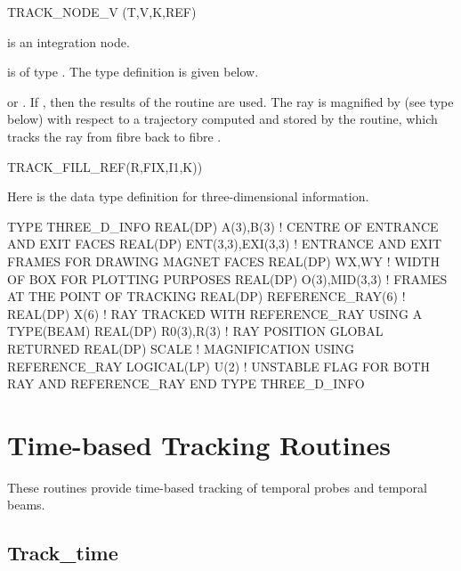 \begin{ptccode}
TRACK_NODE_V (T,V,K,REF)
\end{ptccode}

 is an integration node.

 is of type . The type definition is given below.

%
 or . If , then the results of the
 routine are used. The ray is magnified by 
 (see type  below) with respect to a
trajectory computed and stored by the  routine,
which tracks the ray  from fibre  back to fibre .

\begin{ptccode}
TRACK_FILL_REF(R,FIX,I1,K))
\end{ptccode}

%
Here is the data type definition for three-dimensional information.

\begin{ptccode}
TYPE THREE_D_INFO
  REAL(DP) A(3),B(3)         ! CENTRE OF ENTRANCE AND EXIT FACES
  REAL(DP) ENT(3,3),EXI(3,3) ! ENTRANCE AND EXIT FRAMES FOR DRAWING MAGNET FACES
  REAL(DP) WX,WY             ! WIDTH OF BOX FOR PLOTTING PURPOSES
  REAL(DP) O(3),MID(3,3)     ! FRAMES AT THE POINT OF TRACKING
  REAL(DP) REFERENCE_RAY(6)  !
  REAL(DP) X(6)              ! RAY TRACKED WITH REFERENCE_RAY USING A TYPE(BEAM)
  REAL(DP) R0(3),R(3)        ! RAY POSITION GLOBAL RETURNED
  REAL(DP) SCALE             ! MAGNIFICATION USING REFERENCE_RAY
  LOGICAL(LP) U(2)           ! UNSTABLE FLAG FOR BOTH RAY AND REFERENCE_RAY
END TYPE THREE_D_INFO
\end{ptccode}


\section{Time-based Tracking Routines}

%
These routines provide time-based tracking of temporal probes and temporal beams.


\subsection{Track_time}

